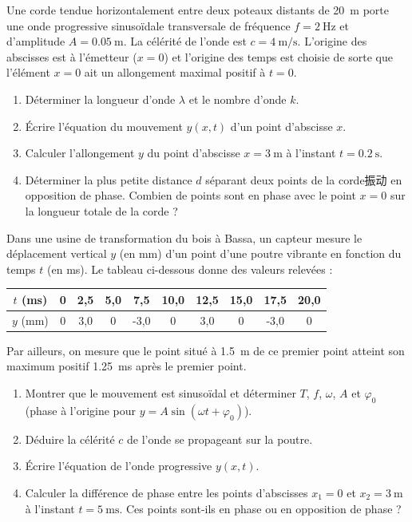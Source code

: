 \documentclass[11pt]{article}
\begin{document}
\begin{exercice}
Une corde tendue horizontalement entre deux poteaux distants de \SI{20}{\meter} porte une onde progressive sinusoïdale transversale de fréquence $f = \SI{2}{\hertz}$ et d'amplitude $A = \SI{0,05}{\meter}$. La célérité de l'onde est $c = \SI{4}{\meter\per\second}$. L'origine des abscisses est à l'émetteur ($x=0$) et l'origine des temps est choisie de sorte que l'élément $x=0$ ait un allongement maximal positif à $t=0$.
\begin{enumerate}
    \item Déterminer la longueur d'onde $\lambda$ et le nombre d'onde $k$.
    \item Écrire l'équation du mouvement $y(x,t)$ d'un point d'abscisse $x$.
    \item Calculer l'allongement $y$ du point d'abscisse $x = \SI{3}{\meter}$ à l'instant $t = \SI{0,2}{\second}$.
    \item Déterminer la plus petite distance $d$ séparant deux points de la corde振动 en opposition de phase. Combien de points sont en phase avec le point $x=0$ sur la longueur totale de la corde ?
\end{enumerate}
\end{exercice}

\begin{exercice}
Dans une usine de transformation du bois à Bassa, un capteur mesure le déplacement vertical $y$ (en mm) d'un point d'une poutre vibrante en fonction du temps $t$ (en ms). Le tableau ci-dessous donne des valeurs relevées :
\begin{center}
\begin{tabular}{|c|c|c|c|c|c|c|c|c|c|}
\hline
$t$ (ms) & 0 & 2,5 & 5,0 & 7,5 & 10,0 & 12,5 & 15,0 & 17,5 & 20,0 \\
\hline
$y$ (mm) & 0 & 3,0 & 0 & -3,0 & 0 & 3,0 & 0 & -3,0 & 0 \\
\hline
\end{tabular}
\end{center}
Par ailleurs, on mesure que le point situé à \SI{1,5}{\meter} de ce premier point atteint son maximum positif \SI{1,25}{\milli\second} après le premier point.
\begin{enumerate}
    \item Montrer que le mouvement est sinusoïdal et déterminer $T$, $f$, $\omega$, $A$ et $\varphi_0$ (phase à l'origine pour $y = A\sin(\omega t + \varphi_0)$).
    \item Déduire la célérité $c$ de l'onde se propageant sur la poutre.
    \item Écrire l'équation de l'onde progressive $y(x,t)$.
    \item Calculer la différence de phase entre les points d'abscisses $x_1 = 0$ et $x_2 = \SI{3}{\meter}$ à l'instant $t = \SI{5}{\milli\second}$. Ces points sont-ils en phase ou en opposition de phase ?
\end{enumerate}
\end{exercice}
\end{document}
